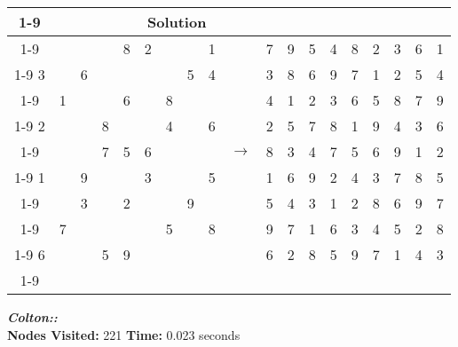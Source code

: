 \documentclass{article}
\begin{document}
\begin{tabular}{||c|c|c||c|c|c||c|c|c|| c ||c|c|c||c|c|c||c|c|c||}
  \cmidrule{1-9} \cmidrule{11-19}
  \multicolumn{9}{|c|}{Problem} &                   & \multicolumn{9}{|c|}{Solution}   \\\cmidrule{1-9} \cmidrule{11-19} \morecmidrules \cmidrule{1-9} \cmidrule{11-19}
   &   &   &   & 8 & 2 &   &   & 1 &               & 7 & 9 & 5 & 4 & 8 & 2 & 3 & 6 & 1\\\cmidrule{1-9} \cmidrule{11-19}
 3 &   & 6 &   &   &   &   & 5 & 4 &               & 3 & 8 & 6 & 9 & 7 & 1 & 2 & 5 & 4\\\cmidrule{1-9} \cmidrule{11-19}
   & 1 &   &   & 6 &   & 8 &   &   &               & 4 & 1 & 2 & 3 & 6 & 5 & 8 & 7 & 9\\\cmidrule{1-9} \cmidrule{11-19} \morecmidrules \cmidrule{1-9} \cmidrule{11-19}
 2 &   &   & 8 &   &   & 4 &   & 6 &               & 2 & 5 & 7 & 8 & 1 & 9 & 4 & 3 & 6\\\cmidrule{1-9} \cmidrule{11-19}
   &   &   & 7 & 5 & 6 &   &   &   & $\rightarrow$ & 8 & 3 & 4 & 7 & 5 & 6 & 9 & 1 & 2\\\cmidrule{1-9} \cmidrule{11-19}
 1 &   & 9 &   &   & 3 &   &   & 5 &               & 1 & 6 & 9 & 2 & 4 & 3 & 7 & 8 & 5\\\cmidrule{1-9} \cmidrule{11-19} \morecmidrules \cmidrule{1-9} \cmidrule{11-19}
   &   & 3 &   & 2 &   &   & 9 &   &               & 5 & 4 & 3 & 1 & 2 & 8 & 6 & 9 & 7\\\cmidrule{1-9} \cmidrule{11-19}
   & 7 &   &   &   &   & 5 &   & 8 &               & 9 & 7 & 1 & 6 & 3 & 4 & 5 & 2 & 8\\\cmidrule{1-9} \cmidrule{11-19}
 6 &   &   & 5 & 9 &   &   &   &   &               & 6 & 2 & 8 & 5 & 9 & 7 & 1 & 4 & 3\\\cmidrule{1-9} \cmidrule{11-19} \morecmidrules \cmidrule{1-9} \cmidrule{11-19}
 \end{tabular}
\newline
\newline
\small\emph{\textbf{Colton::}}\\ \textbf{Nodes Visited:} 221 \textbf{Time:} 0.023 seconds\\
\end{document}
